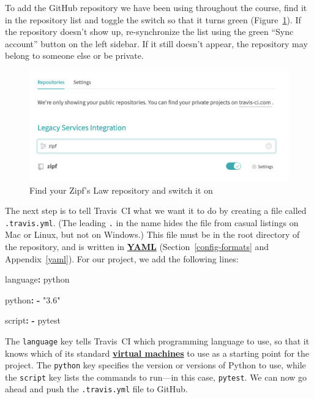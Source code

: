 \documentclass[
]{krantz}
\makeatletter
\newenvironment{Shaded}{\begin{snugshade}}{\end{snugshade}}
\newcommand{\AttributeTok}[1]{\textcolor[rgb]{0.77,0.63,0.00}{#1}}
\newcommand{\FunctionTok}[1]{\textcolor[rgb]{0.00,0.00,0.00}{#1}}
\newcommand{\KeywordTok}[1]{\textcolor[rgb]{0.13,0.29,0.53}{\textbf{#1}}}
\newcommand{\StringTok}[1]{\textcolor[rgb]{0.31,0.60,0.02}{#1}}
\newenvironment{kframe}{%
\medskip{}
\setlength{\fboxsep}{.8em}
 \def\at@end@of@kframe{}%
 \ifinner\ifhmode%
  \def\at@end@of@kframe{\end{minipage}}%
  \begin{minipage}{\columnwidth}%
 \fi\fi%
 \def\FrameCommand##1{\hskip\@totalleftmargin \hskip-\fboxsep
 \colorbox{shadecolor}{##1}\hskip-\fboxsep
     \hskip-\linewidth \hskip-\@totalleftmargin \hskip\columnwidth}%
 \MakeFramed {\advance\hsize-\width
   \@totalleftmargin\z@ \linewidth\hsize
   \@setminipage}}%
 {\par\unskip\endMakeFramed%
 \at@end@of@kframe}
\renewenvironment{Shaded}{\begin{kframe}}{\end{kframe}}
\newcommand{\gref}[2]{\hyperlink{#2}{\textbf{#1}}}
\makeatother
\begin{document}
To add the GitHub repository we have been using throughout the course,
find it in the repository list
and toggle the switch so that it turns green
(Figure~\ref{fig:testing-list-repos}).
If the repository doesn't show up,
re-synchronize the list using the green ``Sync account'' button on the left sidebar.
If it still doesn't appear,
the repository may belong to someone else or be private.

\begin{figure}

{\centering \includegraphics[width=0.5\linewidth]{figures/testing/travis-list-repos} 

}

\caption{Find your Zipf's Law repository and switch it on}\label{fig:testing-list-repos}
\end{figure}

The next step is to tell Travis~CI what we want it to do
by creating a file called \texttt{.travis.yml}.
(The leading \texttt{.} in the name hides the file from casual listings on Mac or Linux,
but not on Windows.)
This file must be in the root directory of the repository,
and is written in \gref{YAML}{yaml\_glossary}
(Section~\ref{config-formats} and Appendix~\ref{yaml}).
For our project,
we add the following lines:

\begin{Shaded}
\begin{Highlighting}[]
\FunctionTok{language}\KeywordTok{:}\AttributeTok{ python}

\FunctionTok{python}\KeywordTok{:}
\KeywordTok{{-}}\AttributeTok{ }\StringTok{"3.6"}

\FunctionTok{script}\KeywordTok{:}
\KeywordTok{{-}}\AttributeTok{ pytest}
\end{Highlighting}
\end{Shaded}

The \texttt{language} key tells Travis~CI which programming language to use,
so that it knows which of its standard \gref{virtual machines}{virtual\_machine} to use
as a starting point for the project.
The \texttt{python} key specifies the version or versions of Python to use,
while the \texttt{script} key lists the commands to run---in this case, \texttt{pytest}.
We can now go ahead and push the \texttt{.travis.yml} file to GitHub.
\end{document}
